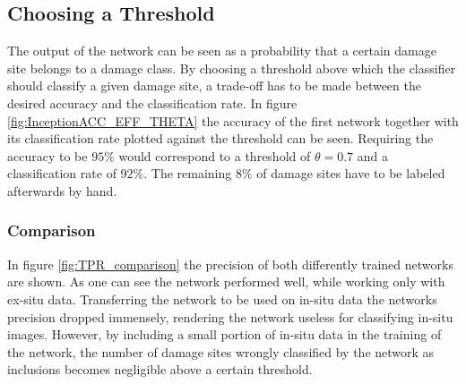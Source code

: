 \subsection{Choosing a Threshold}
The output of the network can be seen as a probability that a certain damage site belongs to a damage class. By choosing a threshold above which the classifier should classify a given damage site, a trade-off has to be made between the desired accuracy and the classification rate. In figure \ref{fig:InceptionACC_EFF_THETA} the accuracy of the first network together with its classification rate plotted against the threshold can be seen. Requiring the accuracy to be $95\%$ would correspond to a threshold of $\theta = 0.7$ and a classification rate of $92\%$. The remaining $8\%$ of damage sites have to be labeled afterwards by hand. 
%
%
%

\subsubsection{Comparison}
In figure \ref{fig:TPR_comparison} the precision of both differently trained networks are shown. As one can see the network performed well, while working only with ex-situ data. Transferring the network to be used on in-situ data the networks precision dropped immensely, rendering the network useless for classifying in-situ images. However, by including a small portion of in-situ data in the training of the network, the number of damage sites wrongly classified by the network as inclusions becomes negligible above a certain threshold. 

